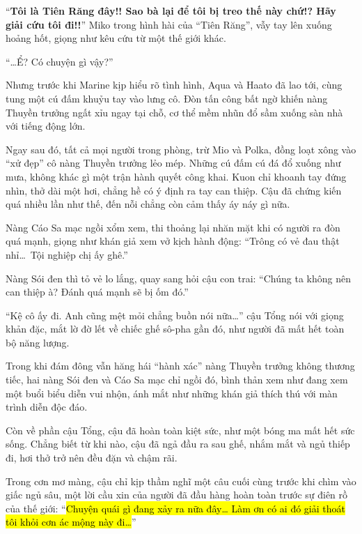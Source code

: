 \documentclass[../main.tex]{subfiles}
\begin{document}
``\textbf{Tôi là Tiên Răng đây!! Sao bà lại để tôi bị treo thế này chứ!? Hãy giải cứu tôi đi!!}'' Miko trong hình hài của ``Tiên Răng'', vẫy tay lên xuống hoảng hốt, giọng như kêu cứu từ một thế giới khác.

``\dots Ể? Có chuyện gì vậy?''

Nhưng trước khi Marine kịp hiểu rõ tình hình, Aqua và Haato đã lao tới, cùng tung một cú đấm khuỷu tay vào lưng cô. Đòn tấn công bất ngờ khiến nàng Thuyền trưởng ngất xỉu ngay tại chỗ, cơ thể mềm nhũn đổ sầm xuống sàn nhà với tiếng động lớn.


Ngay sau đó, tất cả mọi người trong phòng, trừ Mio và Polka, đồng loạt xông vào ``xử đẹp'' cô nàng Thuyền trưởng lẻo mép. Những cú đấm cú đá đổ xuống như mưa, không khác gì một trận hành quyết công khai. Kuon chỉ khoanh tay đứng nhìn, thở dài một hơi, chẳng hề có ý định ra tay can thiệp. Cậu đã chứng kiến quá nhiều lần như thế, đến nỗi chẳng còn cảm thấy áy náy gì nữa.

Nàng Cáo Sa mạc ngồi xổm xem, thi thoảng lại nhăn mặt khi có người ra đòn quá mạnh, giọng như khán giả xem vở kịch hành động: ``Trông có vẻ đau thật nhỉ\dots\ Tội nghiệp chị ấy ghê.''

Nàng Sói đen thì tỏ vẻ lo lắng, quay sang hỏi cậu con trai: ``Chúng ta không nên can thiệp à? Đánh quá mạnh sẽ bị ốm đó.''

``Kệ cô ấy đi. Anh cũng mệt mỏi chẳng buồn nói nữa\dots'' cậu Tổng nói với giọng khản đặc, mắt lờ đờ lết về chiếc ghế sô-pha gần đó, như người đã mất hết toàn bộ năng lượng.

Trong khi đám đông vẫn hăng hái ``hành xác'' nàng Thuyền trưởng không thương tiếc, hai nàng Sói đen và Cáo Sa mạc chỉ ngồi đó, bình thản xem như đang xem một buổi biểu diễn vui nhộn, ánh mắt như những khán giả thích thú với màn trình diễn độc đáo.

Còn về phần cậu Tổng, cậu đã hoàn toàn kiệt sức, như một bóng ma mất hết sức sống. Chẳng biết từ khi nào, cậu đã ngả đầu ra sau ghế, nhắm mắt và ngủ thiếp đi, hơi thở trở nên đều đặn và chậm rãi.

Trong cơn mơ màng, cậu chỉ kịp thầm nghĩ một câu cuối cùng trước khi chìm vào giấc ngủ sâu, một lời cầu xin của người đã đầu hàng hoàn toàn trước sự điên rồ của thế giới: ``\hl{Chuyện quái gì đang xảy ra nữa đây\dots{} Làm ơn có ai đó giải thoát tôi khỏi cơn ác mộng này đi\dots}''

\omk
\end{document}
